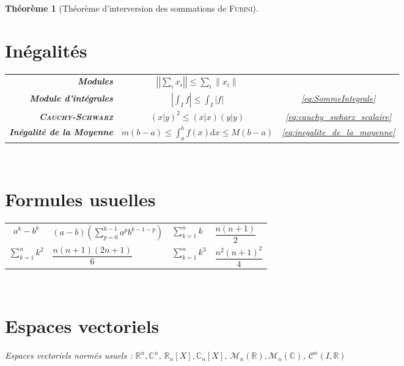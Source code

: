 \documentclass[11pt,a4paper]{report}
\newtheorem{theorem}{Théorème}[chapter]
\theoremstyle{definition}
\begin{document}
\begin{theorem}[Théorème d'interversion des sommations de \textsc{Fubini}]
{{%
\section*{Inégalités}
\begin{tabular}{ >{ \bfseries} r c c}
    Modules & $\left|\left|\sum_i x_i \right| \right| \le \sum_i \| x_i \|$& \\[5mm]
    Module d'intégrales & $\left| \int_I f \right| \le \int_I \left| f \right| $ & \eqref{eq:SommeIntegrale} \\[5mm]
    \textsc{Cauchy}-\textsc{Schwarz} & $ (x|y)^2 \le (x|x)(y|y)$ & \eqref{eq:cauchy_swharz_scalaire} \\[3mm]
    Inégalité de la Moyenne & $m(b-a)\le \int_a^b f(x) \mathrm{d}x \le M(b-a)$ & \eqref{eq:inegalite_de_la_moyenne}
\end{tabular} \\[3mm]

\section{Formules usuelles} %
\label{sec:formules_usuelles}
\begin{tabular}{c@{$\; = \;$}l@{$\qquad$} | @{$\qquad$}l@{$\; = \;$}l}
    $a^k - b^k$&$(a-b) \left( \sum_{p=0}^{k-1} a^p b^{k-1-p} \right) $ &
    $\sum_{k=1}^n k$    & $\dfrac{n(n+1)}{2}$ \\[6mm]
    $\sum_{k=1}^n k^2$  & $\dfrac{n(n+1)(2n+1)}{6}$ &
    $\sum_{k=1}^n k^3$  & $\dfrac{n^2(n+1)^2}{4}$ \\[3mm]
\end{tabular} \\[6mm]


\section{Espaces vectoriels} %
\label{sum:espaces_vectoriels}
   Espaces vectoriels normés usuels : \newline
   $\ensuremath{\mathbb{R}}^n, \ensuremath{\mathbb{C}}^n$, $\ensuremath{\mathbb{R}}_n[X], \ensuremath{\mathbb{C}}_n[X]$, $\mathcal{M}_n(\ensuremath{\mathbb{R}}), \mathcal{M}_n(\ensuremath{\mathbb{C}})$, $\mathcal{C}^n(I, \ensuremath{\mathbb{R}})$
   \\ 

}}
\end{theorem}
\end{document}
